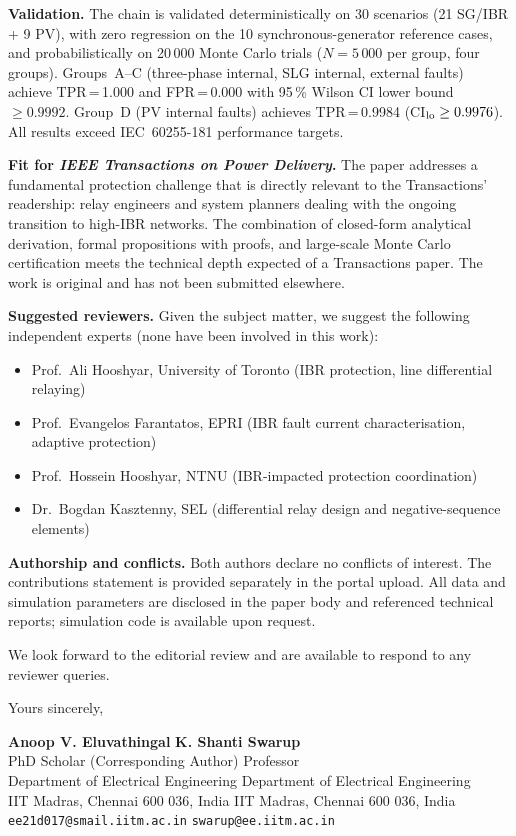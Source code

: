 \documentclass[11pt,a4paper]{article}
\begin{document}
\medskip\noindent\textbf{Validation.}
The chain is validated deterministically on 30 scenarios (21 SG/IBR + 9 PV),
with zero regression on the 10 synchronous-generator reference cases, and
probabilistically on 20\,000 Monte Carlo trials ($N = 5\,000$ per group,
four groups).
Groups~A--C (three-phase internal, SLG internal, external faults) achieve
TPR\,=\,1.000 and FPR\,=\,0.000 with 95\,\% Wilson CI lower bound
$\geq 0.9992$.
Group~D (PV internal faults) achieves TPR\,=\,0.9984
(CI$_{\rm lo} \geq 0.9976$).
All results exceed IEC~60255-181 performance targets.

\medskip\noindent\textbf{Fit for \textit{IEEE Transactions on Power Delivery}.}
The paper addresses a fundamental protection challenge that is directly
relevant to the Transactions' readership: relay engineers and system
planners dealing with the ongoing transition to high-IBR networks.
The combination of closed-form analytical derivation, formal propositions
with proofs, and large-scale Monte Carlo certification meets the technical
depth expected of a Transactions paper.
The work is original and has not been submitted elsewhere.

\medskip\noindent\textbf{Suggested reviewers.}
Given the subject matter, we suggest the following independent experts (none
have been involved in this work):
\begin{itemize}
  \item Prof.\ Ali Hooshyar, University of Toronto (IBR protection,
        line differential relaying)
  \item Prof.\ Evangelos Farantatos, EPRI (IBR fault current characterisation,
        adaptive protection)
  \item Prof.\ Hossein Hooshyar, NTNU (IBR-impacted protection coordination)
  \item Dr.\ Bogdan Kasztenny, SEL (differential relay design and
        negative-sequence elements)
\end{itemize}

\medskip\noindent\textbf{Authorship and conflicts.}
Both authors declare no conflicts of interest.
The contributions statement is provided separately in the portal upload.
All data and simulation parameters are disclosed in the paper body and
referenced technical reports; simulation code is available upon request.

\medskip

We look forward to the editorial review and are available to respond to
any reviewer queries.

\bigskip

\noindent Yours sincerely,

\bigskip\bigskip

\noindent
\textbf{Anoop V. Eluvathingal} \hfill \textbf{K. Shanti Swarup}\\
PhD Scholar (Corresponding Author) \hfill Professor\\
Department of Electrical Engineering \hfill Department of Electrical
Engineering\\
IIT Madras, Chennai 600 036, India \hfill IIT Madras, Chennai 600 036,
India\\
\texttt{ee21d017@smail.iitm.ac.in} \hfill
\texttt{swarup@ee.iitm.ac.in}
\end{document}
